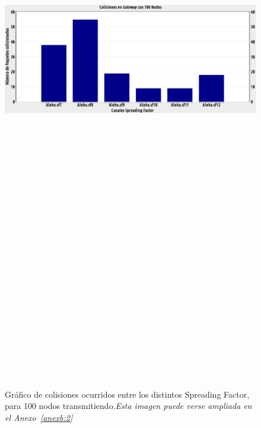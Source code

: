 \begin{justify}
\begin{figure}[!ht]
\includegraphics[width=13cm,height=30cm,keepaspectratio]{images/colisiones100nodos.eps}
\caption{Gráfico de colisiones ocurridos entre los distintos Spreading Factor, para 100 nodos transmitiendo.\textit{Esta imagen puede verse ampliada en el Anexo~\ref{anexb:2}}}
\label{nodos:100}
\end{figure}

\end{justify}

